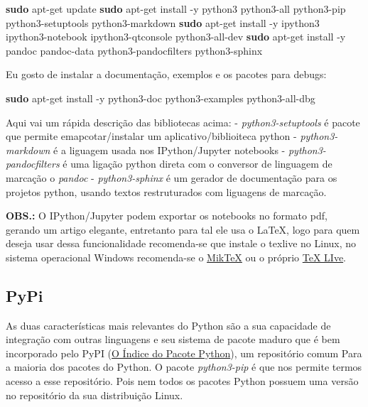\documentclass[11pt]{article}
\newenvironment{Shaded}{}{}
\newcommand{\KeywordTok}[1]{\textcolor[rgb]{0.00,0.44,0.13}{\textbf{{#1}}}}
\newcommand{\NormalTok}[1]{{#1}}
\begin{document}
\begin{Shaded}
\begin{Highlighting}[]
\KeywordTok{sudo} \NormalTok{apt-get update}
\KeywordTok{sudo} \NormalTok{apt-get install -y python3 python3-all python3-pip python3-setuptools python3-markdown }
\KeywordTok{sudo} \NormalTok{apt-get install -y ipython3 ipython3-notebook ipython3-qtconsole python3-all-dev }
\KeywordTok{sudo} \NormalTok{apt-get install -y pandoc pandoc-data python3-pandocfilters python3-sphinx}
\end{Highlighting}
\end{Shaded}

Eu gosto de instalar a documentação, exemplos e os pacotes para debugs:

\begin{Shaded}
\begin{Highlighting}[]
\KeywordTok{sudo} \NormalTok{apt-get install -y python3-doc python3-examples python3-all-dbg}
\end{Highlighting}
\end{Shaded}

Aqui vai um rápida descrição das bibliotecas acima: -
\emph{python3-setuptools} é pacote que permite emapcotar/instalar um
aplicativo/biblioiteca python - \emph{python3-markdown} é a liguagem
usada nos IPython/Jupyter notebooks - \emph{python3-pandocfilters} é uma
ligação python direta com o conversor de linguagem de marcação o
\emph{pandoc} - \emph{python3-sphinx} é um gerador de documentação para
os projetos python, usando textos restruturados com liguagens de
marcação.

\textbf{OBS.:} O IPython/Jupyter podem exportar os notebooks no formato
pdf, gerando um artigo elegante, entretanto para tal ele usa o LaTeX,
logo para quem deseja usar dessa funcionalidade recomenda-se que instale
o texlive no Linux, no sistema operacional Windows recomenda-se o
\href{https://miktex.org/}{MikTeX} ou o próprio
\href{https://www.tug.org/texlive/}{TeX LIve}.

\subsection{PyPi}\label{pypi}

As duas características mais relevantes do Python são a sua capacidade
de integração com outras linguagens e seu sistema de pacote maduro que é
bem incorporado pelo PyPI (\href{https://pypi.python.org/pypi}{O Índice
do Pacote Python}), um repositório comum Para a maioria dos pacotes do
Python. O pacote \emph{python3-pip} é que nos permite termos acesso a
esse repositório. Pois nem todos os pacotes Python possuem uma versão no
repositório da sua distribuição Linux.
\end{document}
